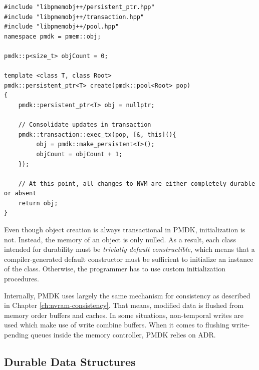 
\vspace{0.5cm}

\begin{lstlisting}[caption={Consistent updates to NVM using PMDK transactions.},captionpos=b, label=lst:pmdk-tx]
#include "libpmemobj++/persistent_ptr.hpp"
#include "libpmemobj++/transaction.hpp"
#include "libpmemobj++/pool.hpp"
namespace pmdk = pmem::obj;

pmdk::p<size_t> objCount = 0;

template <class T, class Root>
pmdk::persistent_ptr<T> create(pmdk::pool<Root> pop)
{
    pmdk::persistent_ptr<T> obj = nullptr;

    // Consolidate updates in transaction
    pmdk::transaction::exec_tx(pop, [&, this](){
         obj = pmdk::make_persistent<T>();
         objCount = objCount + 1;
    });

    // At this point, all changes to NVM are either completely durable or absent
    return obj;
}
\end{lstlisting}

Even though object creation is always transactional in PMDK, initialization is
not. Instead, the memory of an object is only nulled. As a result, each class
intended for durability must be \emph{trivially default constructible}, which
means that a compiler-generated default constructor must be sufficient to
initialize an instance of the class. Otherwise, the programmer has to use custom
initialization procedures.

Internally, PMDK uses largely the same mechanism for consistency as described in
Chapter \ref{ch:nvram-consistency}. That means, modified data is flushed from
memory order buffers and caches. In some situations, non-temporal writes are
used which make use of write combine buffers. When it comes to flushing
write-pending queues inside the memory controller, PMDK relies on ADR.



\subsection{Durable Data Structures}
\label{ch:impl-data}

